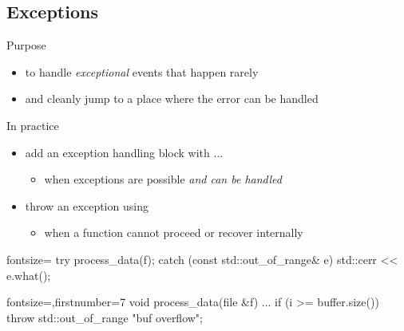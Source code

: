 \subsection[except]{Exceptions}

\begin{frame}[fragile]
  \begin{block}{Purpose}
    \begin{itemize}
      \item to handle \textit{exceptional} events that happen rarely
      \item and cleanly jump to a place where the error can be handled
    \end{itemize}
  \end{block}
  \begin{block}{In practice}
    \begin{itemize}
      \item add an exception handling block with  ... 
      \begin{itemize}
        \item when exceptions are possible \textit{and can be handled}
      \end{itemize}
      \item throw an exception using 
      \begin{itemize}
        \item when a function cannot proceed or recover internally
      \end{itemize}
    \end{itemize}
  \end{block}
  \begin{multicols}{2}
    \begin{cppcode*}{fontsize=\small}
      try {
        process_data(f);
      } catch (const
        std::out_of_range& e) {
        std::cerr << e.what();
      }
    \end{cppcode*}
    \columnbreak
    \begin{cppcode*}{fontsize=\small,firstnumber=7}
      void process_data(file &f) {
        ...
        if (i >= buffer.size())
          throw std::out_of_range{
            "buf overflow"};
      }
    \end{cppcode*}
  \end{multicols}
\end{frame}

